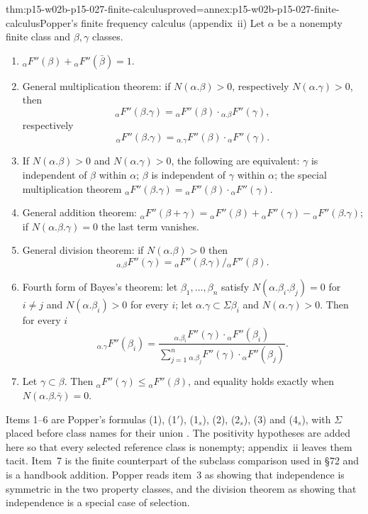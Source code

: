 \begin{hbtheorem}{thm:p15-w02b-p15-027-finite-calculus}{proved=annex:p15-w02b-p15-027-finite-calculus}{Popper's finite frequency calculus (appendix~ii)}
Let \(\alpha\) be a nonempty finite class and \(\beta,\gamma\) classes.
\begin{enumerate}
\item \({}_{\alpha}F''(\beta)+{}_{\alpha}F''(\bar\beta)=1\).
\item General multiplication theorem: if \(N(\alpha.\beta)>0\),
  respectively \(N(\alpha.\gamma)>0\), then
  \[
   {}_{\alpha}F''(\beta.\gamma)={}_{\alpha}F''(\beta)\cdot{}_{\alpha.\beta}F''(\gamma),
  \]
  respectively
  \[
   {}_{\alpha}F''(\beta.\gamma)={}_{\alpha.\gamma}F''(\beta)\cdot{}_{\alpha}F''(\gamma).
  \]
\item If \(N(\alpha.\beta)>0\) and \(N(\alpha.\gamma)>0\), the following
  are equivalent: \(\gamma\) is independent of \(\beta\) within \(\alpha\);
  \(\beta\) is independent of \(\gamma\) within \(\alpha\); the special
  multiplication theorem
  \({}_{\alpha}F''(\beta.\gamma)={}_{\alpha}F''(\beta)\cdot{}_{\alpha}F''(\gamma)\).
\item General addition theorem:
  \({}_{\alpha}F''(\beta+\gamma)={}_{\alpha}F''(\beta)+{}_{\alpha}F''(\gamma)
  -{}_{\alpha}F''(\beta.\gamma)\); if \(N(\alpha.\beta.\gamma)=0\) the last
  term vanishes.
\item General division theorem: if \(N(\alpha.\beta)>0\) then
  \[
   {}_{\alpha.\beta}F''(\gamma)={}_{\alpha}F''(\beta.\gamma)/{}_{\alpha}F''(\beta).
  \]
\item Fourth form of Bayes's theorem: let \(\beta_1,\ldots,\beta_n\)
  satisfy \(N(\alpha.\beta_i.\beta_j)=0\) for \(i\neq j\) and
  \(N(\alpha.\beta_i)>0\) for every \(i\); let
  \(\alpha.\gamma\subset\Sigma\beta_i\) and \(N(\alpha.\gamma)>0\). Then
  for every \(i\)
  \[
   {}_{\alpha.\gamma}F''(\beta_i)
   =\frac{{}_{\alpha.\beta_i}F''(\gamma)\cdot{}_{\alpha}F''(\beta_i)}
          {\sum_{j=1}^n{}_{\alpha.\beta_j}F''(\gamma)\cdot{}_{\alpha}F''(\beta_j)} .
  \]
\item Let \(\gamma\subset\beta\). Then
  \({}_{\alpha}F''(\gamma)\leq{}_{\alpha}F''(\beta)\), and equality
  holds exactly when \(N(\alpha.\beta.\bar\gamma)=0\).
\end{enumerate}
\end{hbtheorem}

Items 1--6 are Popper's formulas (1), (1\('\)), (1\(_s\)), (2), (2\(_s\)),
(3) and (4\(_s\)), with \(\Sigma\) placed before class names for their
union \parencite[\S52; appendix~ii]{Popper2002LogicDiscoveryUI}.
The positivity hypotheses are added here so that every selected
reference class is nonempty; appendix~ii leaves them tacit. Item~7 is the
finite counterpart of the subclass comparison used in \S72 and is a
handbook addition. Popper reads item~3 as showing that independence is
symmetric in the two property classes, and the division theorem as
showing that independence is a special case of selection.

